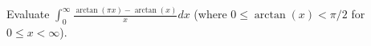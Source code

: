Evaluate $\displaystyle{\int_0^\infty \frac{\arctan(\pi x) - \arctan(x)}{x} dx}$
(where $0 \le \arctan(x) < \pi/2$ for $0 \le x < \infty$).
